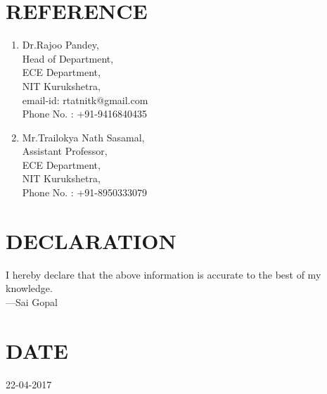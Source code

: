 \documentclass[a4paper]{article}
\begin{document}
\section*{\textbf{REFERENCE}}
\begin{enumerate}
\item Dr.Rajoo Pandey,\\
Head of Department,\\
ECE Department,\\
NIT Kurukshetra,\\
email-id: rtatnitk@gmail.com\\
Phone No. : +91-9416840435
\item Mr.Trailokya Nath Sasamal,\\
Assistant Professor,\\
ECE Department,\\
NIT Kurukshetra,\\
Phone No. : +91-8950333079
\end{enumerate}

\section*{\textbf{DECLARATION}}
I hereby declare that the above information is accurate to the best of my knowledge.\\
---Sai Gopal

\section*{\textbf{DATE}}
22-04-2017
\end{document}

